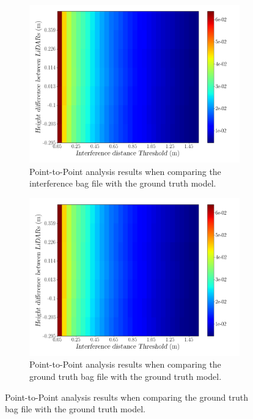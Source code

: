 \begin{figure}[!ht]
\centering
\begin{subfigure}[c]{0.45\textwidth}
	\includegraphics[width=\textwidth]{img/lidar-interference/height/interference_distance_color_mesh.png}
	\caption{Point-to-Point analysis results when comparing the interference bag file with the ground truth model.}
	\label{fig:height:interference-color-mesh}
\end{subfigure}
\qquad
\begin{subfigure}[c]{0.45\textwidth}
	\includegraphics[width=\textwidth]{img/lidar-interference/height/ground_truth_distance_color_mesh.png}
	\caption{Point-to-Point analysis results when comparing the ground truth bag file with the ground truth model.}

\end{subfigure}
\end{figure}
